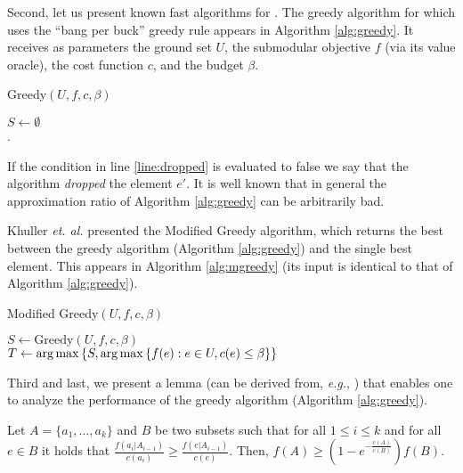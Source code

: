 \documentclass[a4paper,UKenglish,cleveref, autoref]{lipics-v2019}
\begin{document}
Second, let us present known fast algorithms for \SK.
The greedy algorithm for \SK which uses the ``bang per buck'' greedy rule appears in Algorithm \ref{alg:greedy}.
It receives as parameters the ground set $U$, the submodular objective $f$ (via its value oracle), the cost function $c$, and the budget $\beta$.

\begin{algorithm}[H]
\caption{Greedy$(U, f, c, \beta)$}
\label{alg:greedy}
$S \leftarrow \emptyset$
\\
.
\end{algorithm}

If the condition in line \ref{line:dropped} is evaluated to false we say that
the algorithm \emph{dropped} the element $e'$.
It is well known that in general the approximation ratio of Algorithm \ref{alg:greedy}
can be arbitrarily bad.

Khuller {\em et. al.} \cite{khuller1999budgeted} presented the Modified Greedy algorithm, which returns the best between the greedy algorithm (Algorithm \ref{alg:greedy}) and the single best element.
This appears in Algorithm \ref{alg:mgreedy} (its input is identical to that of Algorithm \ref{alg:greedy}).

\begin{algorithm}[H]
\caption{Modified Greedy$(U, f, c, \beta)$}
\label{alg:mgreedy}

$S \leftarrow \text{Greedy}(U, f, c, \beta)$
\\
$T \leftarrow \operatorname*{arg\,max}\left\{S, \operatorname*{arg\,max} \left\{f(e):e\in U, c(e)\leq \beta \right\} \right\}$
\\
\end{algorithm}

Third and last, we present a lemma (can be derived from, {\em e.g.}, \cite{khuller1999budgeted}) that enables one to analyze the performance of the greedy algorithm (Algorithm \ref{alg:greedy}).
\begin{lemma}
\label{lemma:sub-main}
Let $A = \{a_1, \dots, a_k\}$ and $B$ be two subsets such that for all $1 \leq i \leq k$
and for all $e \in B$ it holds that
$\frac{f(a_i|A_{i-1})}{c(a_i)} \geq \frac{f(e|A_{i-1})}{c(e)}$.
Then, $f(A) \geq (1 - e^{-\frac{c(A)}{c(B)}})f(B)$.
\end{lemma}
\end{document}
